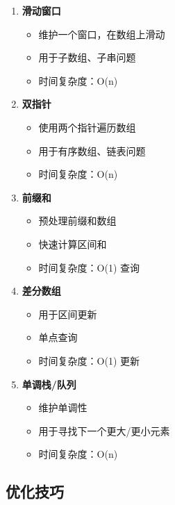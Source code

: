 \begin{enumerate}
  \item \textbf{滑动窗口}
    \begin{itemize}
      \item 维护一个窗口，在数组上滑动
      \item 用于子数组、子串问题
      \item 时间复杂度：O(n)
    \end{itemize}

  \item \textbf{双指针}
    \begin{itemize}
      \item 使用两个指针遍历数组
      \item 用于有序数组、链表问题
      \item 时间复杂度：O(n)
    \end{itemize}

  \item \textbf{前缀和}
    \begin{itemize}
      \item 预处理前缀和数组
      \item 快速计算区间和
      \item 时间复杂度：O(1) 查询
    \end{itemize}

  \item \textbf{差分数组}
    \begin{itemize}
      \item 用于区间更新
      \item 单点查询
      \item 时间复杂度：O(1) 更新
    \end{itemize}

  \item \textbf{单调栈/队列}
    \begin{itemize}
      \item 维护单调性
      \item 用于寻找下一个更大/更小元素
      \item 时间复杂度：O(n)
    \end{itemize}
\end{enumerate}

\subsection{优化技巧}


